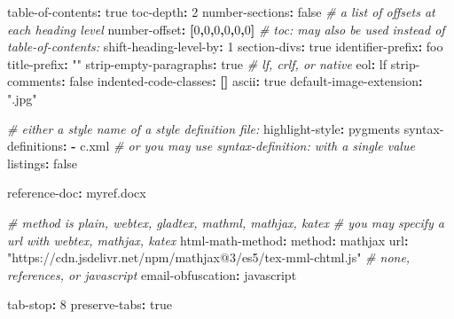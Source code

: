 \documentclass[]{article}
\newenvironment{Shaded}{}{}
\newcommand{\AttributeTok}[1]{\textcolor[rgb]{0.49,0.56,0.16}{#1}}
\newcommand{\CharTok}[1]{\textcolor[rgb]{0.25,0.44,0.63}{#1}}
\newcommand{\CommentTok}[1]{\textcolor[rgb]{0.38,0.63,0.69}{\textit{#1}}}
\newcommand{\DecValTok}[1]{\textcolor[rgb]{0.25,0.63,0.44}{#1}}
\newcommand{\FunctionTok}[1]{\textcolor[rgb]{0.02,0.16,0.49}{#1}}
\newcommand{\KeywordTok}[1]{\textcolor[rgb]{0.00,0.44,0.13}{\textbf{#1}}}
\newcommand{\StringTok}[1]{\textcolor[rgb]{0.25,0.44,0.63}{#1}}
\begin{document}
\begin{Shaded}
\begin{Highlighting}[]
\FunctionTok{table{-}of{-}contents}\KeywordTok{:}\AttributeTok{ }\CharTok{true}
\FunctionTok{toc{-}depth}\KeywordTok{:}\AttributeTok{ }\DecValTok{2}
\FunctionTok{number{-}sections}\KeywordTok{:}\AttributeTok{ }\CharTok{false}
\CommentTok{\# a list of offsets at each heading level}
\FunctionTok{number{-}offset}\KeywordTok{:}\AttributeTok{ }\KeywordTok{[}\DecValTok{0}\KeywordTok{,}\DecValTok{0}\KeywordTok{,}\DecValTok{0}\KeywordTok{,}\DecValTok{0}\KeywordTok{,}\DecValTok{0}\KeywordTok{,}\DecValTok{0}\KeywordTok{]}
\CommentTok{\# toc: may also be used instead of table{-}of{-}contents:}
\FunctionTok{shift{-}heading{-}level{-}by}\KeywordTok{:}\AttributeTok{ }\DecValTok{1}
\FunctionTok{section{-}divs}\KeywordTok{:}\AttributeTok{ }\CharTok{true}
\FunctionTok{identifier{-}prefix}\KeywordTok{:}\AttributeTok{ foo}
\FunctionTok{title{-}prefix}\KeywordTok{:}\AttributeTok{ }\StringTok{""}
\FunctionTok{strip{-}empty{-}paragraphs}\KeywordTok{:}\AttributeTok{ }\CharTok{true}
\CommentTok{\# lf, crlf, or native}
\FunctionTok{eol}\KeywordTok{:}\AttributeTok{ lf}
\FunctionTok{strip{-}comments}\KeywordTok{:}\AttributeTok{ }\CharTok{false}
\FunctionTok{indented{-}code{-}classes}\KeywordTok{:}\AttributeTok{ }\KeywordTok{[]}
\FunctionTok{ascii}\KeywordTok{:}\AttributeTok{ }\CharTok{true}
\FunctionTok{default{-}image{-}extension}\KeywordTok{:}\AttributeTok{ }\StringTok{".jpg"}

\CommentTok{\# either a style name of a style definition file:}
\FunctionTok{highlight{-}style}\KeywordTok{:}\AttributeTok{ pygments}
\FunctionTok{syntax{-}definitions}\KeywordTok{:}
\KeywordTok{{-}}\AttributeTok{ c.xml}
\CommentTok{\# or you may use syntax{-}definition: with a single value}
\FunctionTok{listings}\KeywordTok{:}\AttributeTok{ }\CharTok{false}

\FunctionTok{reference{-}doc}\KeywordTok{:}\AttributeTok{ myref.docx}

\CommentTok{\# method is plain, webtex, gladtex, mathml, mathjax, katex}
\CommentTok{\# you may specify a url with webtex, mathjax, katex}
\FunctionTok{html{-}math{-}method}\KeywordTok{:}
\AttributeTok{  }\FunctionTok{method}\KeywordTok{:}\AttributeTok{ mathjax}
\AttributeTok{  }\FunctionTok{url}\KeywordTok{:}\AttributeTok{ }\StringTok{"https://cdn.jsdelivr.net/npm/mathjax@3/es5/tex{-}mml{-}chtml.js"}
\CommentTok{\# none, references, or javascript}
\FunctionTok{email{-}obfuscation}\KeywordTok{:}\AttributeTok{ javascript}

\FunctionTok{tab{-}stop}\KeywordTok{:}\AttributeTok{ }\DecValTok{8}
\FunctionTok{preserve{-}tabs}\KeywordTok{:}\AttributeTok{ }\CharTok{true}


\end{Highlighting}
\end{Shaded}
\end{document}
